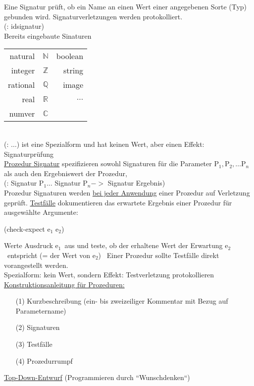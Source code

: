 Eine Signatur pr\"uft, ob ein Name an einen Wert einer angegebenen Sorte (Typ) gebunden wird. Signaturverletzungen werden protokolliert.\\
(: \auf id\zu \auf signatur\zu)\\
Bereits eingebaute Sinaturen\\
\begin{tabular}{rc|r}
natural&$\mathbb{N}$& boolean\\
integer&$\mathbb{Z}$& string\\
rational&$\mathbb{Q}$& image\\
real&$\mathbb{R}$&$\ldots$\\
numver&$\mathbb{C}$
\end{tabular}\\
(: $\ldots$) ist eine Spezialform und hat keinen Wert, aber einen Effekt: Signaturpr\"ufung\\
\underline{Prozedur Signatur} spezifizieren sowohl Signaturen f\"ur die Parameter $\text{P}_1,\text{P}_2,\ldots\text{P}_n$ als auch den Ergebniswert der Prozedur,\\
(: \auf Signatur $\text{P}_1$\zu $\ldots$ \auf Signatur $\text{P}_n$\zu $->$ \auf Signatur Ergebnis\zu)\\
Prozedur Signaturen werden \underline{bei jeder Anwendung} einer Prozedur auf Verletzung gepr\"uft. \underline{Testf\"alle} dokumentieren das erwartete Ergebnis einer Prozedur f\"ur ausgew\"ahlte Argumente:
\begin{center}
(check-expect \auf $\text{e}_1$\zu \auf
$\text{e}_2$\zu)\end{center}
Werte Ausdruck \auf $\text{e}_1$\zu \ aus und teste, ob der erhaltene Wert der Erwartung \auf $\text{e}_2$\zu \ entspricht (= der Wert von \auf $\text{e}_2$\zu) \
Einer Prozedur sollte Testf\"alle direkt vorangestellt werden.\\
Spezialform: kein Wert, sondern Effekt: Testverletzung protokollieren
\bigskip\\
\underline{Konstruktionsanleitung f\"ur Prozeduren:}
\begin{enumerate}
\item[(1)]Kurzbeschreibung (ein- bis zweizeiliger Kommentar mit Bezug auf Parametername)
\item[(2)]Signaturen
\item[(3)]Testf\"alle
\item[(4)]Prozedurrumpf
\end{enumerate}
\underline{Top-Down-Entwurf} (Programmieren durch ``Wunschdenken``)\\
